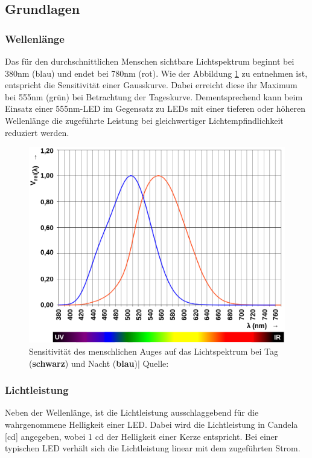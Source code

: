 \documentclass[12pt]{article}
\begin{document}
	\subsection{Grundlagen}
	\subsubsection*{Wellenlänge} \label{Wellenlänge}
	Das für den durchschnittlichen Menschen sichtbare Lichtspektrum beginnt bei 380nm (blau) und endet bei 780nm (rot)\cite{noauthor_v-lambda-kurve_2023}. Wie der Abbildung \ref{fig:batv-lambda-curve} zu entnehmen ist, entspricht die Sensitivität einer Gausskurve. Dabei erreicht diese ihr Maximum bei 555nm (grün) bei Betrachtung der Tageskurve. Dementsprechend kann beim Einsatz einer 555nm-LED im Gegensatz zu LEDs mit einer tieferen oder höheren Wellenlänge die zugeführte Leistung bei gleichwertiger Lichtempfindlichkeit reduziert werden.
	\begin{figure}[H]
		\centering
		\includegraphics[width=0.8\linewidth]{images/BAT_v-lambda-curve}
		\caption{Sensitivität des menschlichen Auges auf das Lichtspektrum bei Tag (\color{red}\textbf{schwarz}\color{black}) und Nacht (\color{blue}\textbf{blau}\color{black})$\vert$ Quelle: \cite{noauthor_v-lambda-kurve_2023}}
		\label{fig:batv-lambda-curve}
	\end{figure}
	\subsubsection*{Lichtleistung}
	Neben der Wellenlänge, ist die Lichtleistung ausschlaggebend für die wahrgenommene Helligkeit einer LED. Dabei wird die Lichtleistung in Candela [cd] angegeben, wobei 1 cd der Helligkeit einer Kerze entspricht. Bei einer typischen LED verhält sich die Lichtleistung linear mit dem zugeführten Strom.
\end{document}
